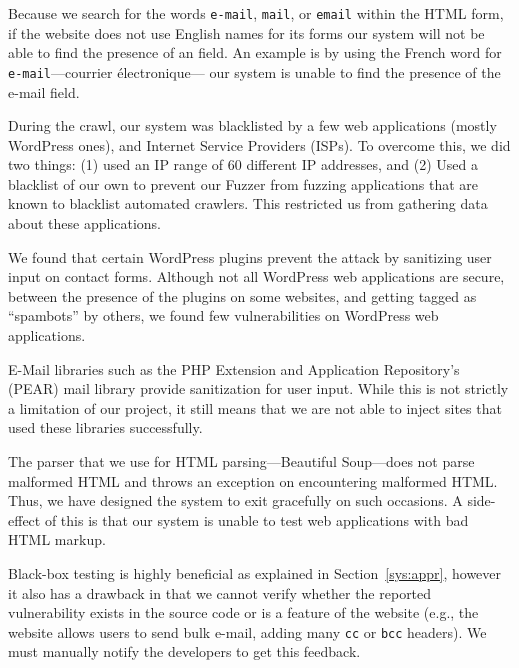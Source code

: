         Because we search for the words \texttt{e-mail}, \texttt{mail}, or \texttt{email} within the HTML form, if the website does not use English names for its forms our system will not be able to find the presence of an \email field. An example is by using the French word for \texttt{e-mail}---courrier {{\'e}}lectronique--- our system is unable to find the presence of the e-mail field. 
        
		During the crawl, our system was blacklisted by a few web
        applications (mostly WordPress ones), and Internet Service
        Providers (ISPs). To overcome this, we did two things: (1)
        used an IP range of 60 different IP addresses, and (2) Used a
        blacklist of our own to prevent our Fuzzer from fuzzing
        applications that are known to blacklist automated crawlers.
        This restricted us from gathering data about these
        applications.


		We found that certain WordPress plugins prevent the \ehi attack by sanitizing user input on contact forms. Although not all  WordPress web applications are secure, between the presence of the plugins on some websites, and getting tagged as ``spambots'' by others, we found few vulnerabilities on WordPress web applications.

        E-Mail libraries such as the PHP Extension and Application Repository's (PEAR) mail library provide sanitization for user input. While this is not strictly a limitation of our project, it still means that we are not able to inject sites that used these libraries successfully.

        The parser that we use for HTML parsing---Beautiful Soup---does not parse malformed HTML and throws an exception on encountering malformed HTML. Thus, we have designed the system to exit gracefully on such occasions. A side-effect of this is that our system is unable to test web applications with bad HTML markup.

        Black-box testing is highly beneficial as explained in Section~\ref{sys:appr}, however it also has a drawback in that we cannot verify whether the reported vulnerability exists in the source code or is a feature of the website (e.g., the website allows users to send bulk e-mail, adding many \texttt{cc} or \texttt{bcc} headers). We must manually notify the developers to get this feedback.


